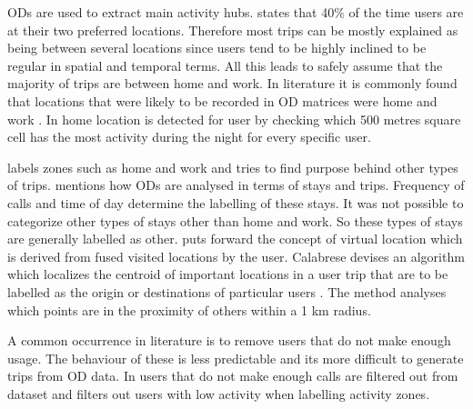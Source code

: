 \documentclass[12pt, a4paper]{report}
\theoremstyle{definition}
\theoremstyle{definition}%
\theoremstyle{definition}%
\theoremstyle{definition}%
\theoremstyle{definition}%
\theoremstyle{definition}%
\begin{document}
ODs are used to extract main activity hubs. \cite{Gonzalez2008} states that 40\% of the time users are at their two preferred locations.  Therefore most trips can be mostly explained as being  between several locations since users tend to be highly inclined to be regular in spatial and temporal terms. All this leads to safely assume that the majority of trips are between home and work. In literature it  is commonly found that locations that were likely to be recorded in OD matrices were home and work \cite{Calabrese2011,Colak2015}.  In \cite{Calabrese2011} home location is detected for user by checking which 500 metres square cell has the most activity during the night for every specific user.

\cite{Colak2015} labels zones such as home and work and tries to find purpose behind other types of trips. \cite{Colak2015} mentions how ODs are analysed in terms of stays and trips. Frequency of calls and time of day determine the labelling of these stays. It was not possible to categorize other types of stays other than home and work. So these types of stays are generally labelled as other.
\cite{Calabrese2011} puts forward the concept of virtual location which is derived from fused visited locations by the user. Calabrese devises an algorithm which localizes the centroid of important locations in a user trip that are to be labelled as the origin or destinations of particular users \cite{Calabrese2011}. The method analyses which points are in the proximity of others within a 1 km radius. 

A common occurrence in literature is to remove users that do not make enough usage. The behaviour of these is less predictable and its more difficult to generate trips from OD data. In \cite{Toole2015} users that do not make enough calls are filtered out from dataset and \cite{Colak2015} filters out users with low activity when labelling activity zones. 
\end{document}
